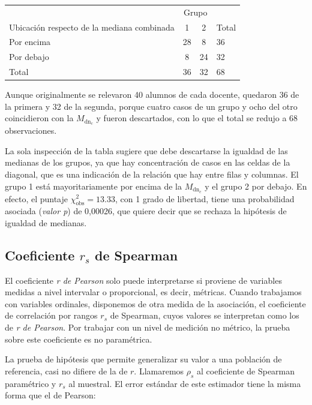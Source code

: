 \documentclass[]{book}
\begin{document}
\begin{table}[H]
\centering
\begin{tabular}{lccl}
\toprule
\multicolumn{1}{c}{ } & \multicolumn{2}{c}{Grupo} & \multicolumn{1}{c}{ } \\
\cmidrule(l{3pt}r{3pt}){2-3}
Ubicación respecto de la mediana combinada & 1 & 2 & Total\\
\midrule
\rowcolor{gray!6}  Por encima & 28 & 8 & 36\\
Por debajo & 8 & 24 & 32\\
\rowcolor{gray!6}  Total & 36 & 32 & 68\\
\bottomrule
\end{tabular}
\end{table}

Aunque originalmente se relevaron 40 alumnos de cada docente, quedaron
36 de la primera y 32 de la segunda, porque cuatro casos de un grupo y
ocho del otro coincidieron con la \(M_{\text{dn}_{c}}\) y fueron
descartados, con lo que el total se redujo a 68 observaciones.

La sola inspección de la tabla sugiere que debe descartarse la igualdad
de las medianas de los grupos, ya que hay concentración de casos en las
celdas de la diagonal, que es una indicación de la relación que hay
entre filas y columnas. El grupo 1 está mayoritariamente por encima de
la \(M_{\text{dn}_{c}}\) y el grupo 2 por debajo. En efecto, el puntaje
\(\chi_{\text{obs}}^{2} = 13.33\), con 1 grado de libertad, tiene una
probabilidad asociada (\emph{valor p}) de 0,00026, que quiere decir que se
rechaza la hipótesis de igualdad de medianas.

\hypertarget{coeficiente-r_s-de-spearman}{%
\subsection{\texorpdfstring{Coeficiente \(r_s\) de Spearman}{Coeficiente r\_s de Spearman}}\label{coeficiente-r_s-de-spearman}}

El coeficiente \emph{r de Pearson} solo puede interpretarse si proviene de
variables medidas a nivel intervalar o proporcional, es decir, métricas.
Cuando trabajamos con variables ordinales, disponemos de otra medida de
la asociación, el coeficiente de correlación por rangos \(r_s\) de Spearman, cuyos valores se interpretan como los de \emph{r de Pearson}. Por
trabajar con un nivel de medición no métrico, la prueba sobre este
coeficiente es no paramétrica.

La prueba de hipótesis que permite generalizar su valor a una población
de referencia, casi no difiere de la de \(r\). Llamaremos \(\rho_{s}\) al
coeficiente de Spearman paramétrico y \(r_s\) al muestral. El error
estándar de este estimador tiene la misma forma que el de Pearson:
\end{document}
